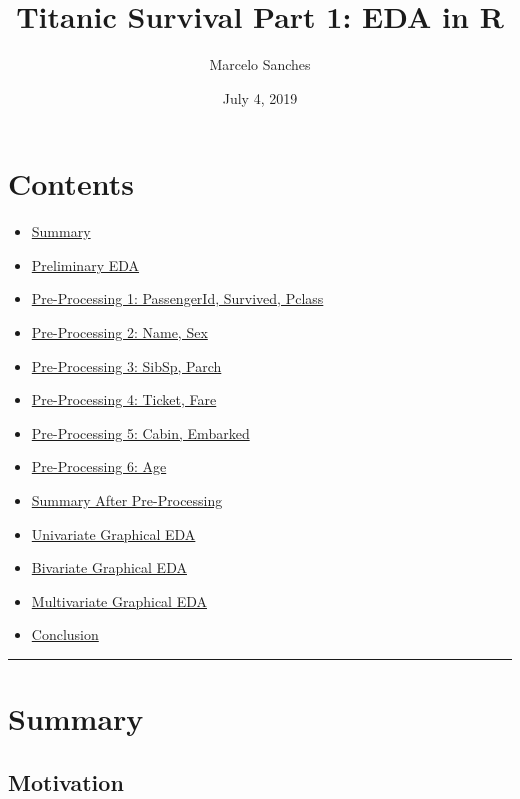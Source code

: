 \documentclass[]{article}
\title{Titanic Survival Part 1: EDA in R}
\author{Marcelo Sanches}
\date{July 4, 2019}
\providecommand{\tightlist}{%
  \setlength{\itemsep}{0pt}\setlength{\parskip}{0pt}}
\begin{document}
\maketitle

\section{Contents}\label{contents}

\begin{itemize}
\tightlist
\item
  \protect\hyperlink{summary-link}{Summary}
\item
  \protect\hyperlink{prelimEDA-link}{Preliminary EDA}
\item
  \protect\hyperlink{preprocess1-link}{Pre-Processing 1: PassengerId,
  Survived, Pclass}
\item
  \protect\hyperlink{preprocess2-link}{Pre-Processing 2: Name, Sex}
\item
  \protect\hyperlink{preprocess3-link}{Pre-Processing 3: SibSp, Parch}
\item
  \protect\hyperlink{preprocess4-link}{Pre-Processing 4: Ticket, Fare}
\item
  \protect\hyperlink{preprocess5-link}{Pre-Processing 5: Cabin,
  Embarked}
\item
  \protect\hyperlink{preprocess6-link}{Pre-Processing 6: Age}
\item
  \protect\hyperlink{postsummary-link}{Summary After Pre-Processing}
\item
  \protect\hyperlink{unigraphEDA-link}{Univariate Graphical EDA}
\item
  \protect\hyperlink{bigraphEDA-link}{Bivariate Graphical EDA}
\item
  \protect\hyperlink{multigraphEDA-link}{Multivariate Graphical EDA}
\item
  \protect\hyperlink{conclusion-link}{Conclusion}
\end{itemize}

\begin{center}\rule{0.5\linewidth}{\linethickness}\end{center}

\hypertarget{summary-link}{\section{Summary}\label{summary-link}}

\subsection{Motivation}\label{motivation}
\end{document}

